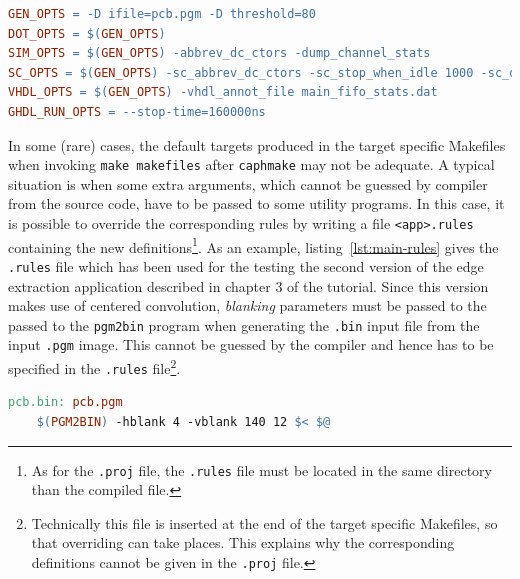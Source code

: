 \begin{lstlisting}[language=make,tabsize=4,basicstyle=\footnotesize,frame=single,caption={A possible 
    \texttt{.proj} file for the edge extraction application described in chapter 3 of the "Caph
    Primer"},label={lst:main-proj}]
GEN_OPTS = -D ifile=pcb.pgm -D threshold=80 
DOT_OPTS = $(GEN_OPTS)
SIM_OPTS = $(GEN_OPTS) -abbrev_dc_ctors -dump_channel_stats
SC_OPTS = $(GEN_OPTS) -sc_abbrev_dc_ctors -sc_stop_when_idle 1000 -sc_dump_fifo_stats 
VHDL_OPTS = $(GEN_OPTS) -vhdl_annot_file main_fifo_stats.dat
GHDL_RUN_OPTS = --stop-time=160000ns 
\end{lstlisting}

\medskip In some (rare) cases, the default targets produced in the target specific Makefiles when
invoking \verb|make makefiles| after \verb|caphmake| may not be adequate. A typical situation is
when some extra arguments, which cannot be guessed by compiler from the source code, have to be
passed to some utility programs. In this case, it is possible to override the corresponding rules by
writing a file \verb|<app>.rules| containing the new definitions\footnote{As for the \texttt{.proj}
  file, the \texttt{.rules} file must be located in the same directory than the compiled file.}.  As
an example, listing~\ref{lst:main-rules} gives the \verb|.rules| file which has been used for the testing
the second version of the edge extraction application described in chapter 3 of the \caph tutorial. 
Since this version makes use of centered convolution, \emph{blanking} parameters must be passed to
the passed to the \verb|pgm2bin| program when generating the \verb|.bin| input file from the input
\verb|.pgm| image. This cannot be guessed by the compiler and hence has to be specified in the
\verb|.rules| file\footnote{Technically this file is inserted at the end of the target specific Makefiles,
so that overriding can take places.  This explains why the corresponding definitions cannot
  be given in the \texttt{.proj} file.}.

\begin{lstlisting}[language=make,tabsize=4,basicstyle=\footnotesize,frame=single,caption={A possible 
    \texttt{.rules} file for the seconde version of the application described in chapter 3 of the
    tutorial},label={lst:main-rules}]
pcb.bin: pcb.pgm
	$(PGM2BIN) -hblank 4 -vblank 140 12 $< $@
\end{lstlisting}

